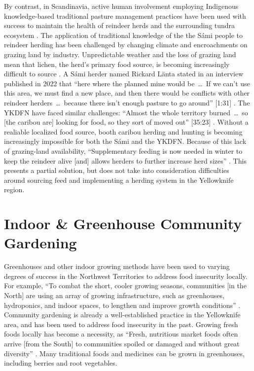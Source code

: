 \documentclass{report}
\begin{document}
\hspace{24pt} By contrast, in Scandinavia, active human involvement employing Indigenous knowledge-based traditional pasture management practices have been used with success to maintain the health of reindeer herds and the surrounding tundra ecosystem \parencite{reindeerfoodsovereignty}.
The application of traditional knowledge of the the S\'ami people to reindeer herding has been challenged by changing climate and encroachments on grazing land by industry. Unpredictable weather and the loss of grazing land mean that lichen, the herd's primary food source, is becoming increasingly difficult to source \parencite{samishiftingstrategies}.
A S\'ami herder named Rickard L\"anta stated in an interview published in 2022 that ``here where the planned mine would be~\ldots~If we can't use this area, we must find a new place, and then there would be conflicts with other reindeer herders~\ldots~because there isn't enough pasture to go around'' [1:31] \parencite{samiherders}.
The YKDFN have faced similar challenges: ``Almost the whole territory burned~\ldots~so [the caribou are] looking for food, so they sort of moved out'' [35:23] \parencite{jonassangris}. Without a realiable localized food source, booth caribou herding and hunting is becoming increasingly impossible for both the S\'ami and the YKDFN.
Because of this lack of grazing-land availability, ``Supplementary feeding is now needed in winter to keep the reindeer alive [and] allows herders to further increase herd sizes'' \parencite[35]{reindeerfoodsovereignty}. This presents a partial solution, but does not take into consideration difficulties around sourcing feed and implementing a herding system in the Yellowknife region.

\section{Indoor \& Greenhouse Community Gardening}

\hspace{24pt} Greenhouses and other indoor growing methods have been used to varying degrees of success in the Northwest Territories to address food insecurity locally. For example, ``To combat the short, cooler growing seasons, communities [in the North] are using an array of growing infrastructure, such as greenhouses, hydroponics, and indoor spaces, to lengthen and improve growth conditions'' \parencite[90]{resilientcommunities}.
Community gardening is already a well-established practice in the Yellowknife area, and has been used to address food insecurity in the past. Growing fresh foods locally has become a necessity, as ``Fresh, nutritious market foods often arrive [from the South] to communities spoiled or damaged and without great diversity'' \parencite[85]{resilientcommunities}. Many traditional foods and medicines can be grown in greenhouses, including berries and root vegetables.
\end{document}
